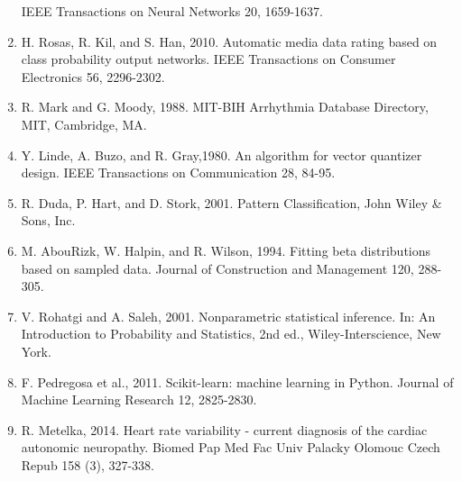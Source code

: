 \documentclass[times,twocolumn,final,authoryear]{elsarticle}
\begin{document}
\begin{enumerate}
     IEEE Transactions on Neural Networks 20, 1659-1637.
\item H. Rosas, R. Kil, and S. Han, 2010. Automatic media data rating based on class probability output networks.
     IEEE Transactions on Consumer Electronics 56, 2296-2302.
\item R. Mark and G. Moody, 1988. MIT-BIH Arrhythmia Database Directory, MIT, Cambridge, MA.
\item Y. Linde, A. Buzo, and R. Gray,1980. An algorithm for vector quantizer design.
     IEEE Transactions on Communication 28, 84-95.
\item R. Duda, P. Hart, and D. Stork, 2001. Pattern Classification, John Wiley \& Sons, Inc.
\item M. AbouRizk, W. Halpin, and R. Wilson, 1994. Fitting beta distributions based on sampled data.
     Journal of Construction and Management 120, 288-305.
\item V. Rohatgi and A. Saleh, 2001. Nonparametric statistical inference. In:
     An Introduction to Probability and Statistics, 2nd ed., Wiley-Interscience, New York.
\item F. Pedregosa et al., 2011. Scikit-learn: machine learning in Python.
     Journal of Machine Learning Research 12, 2825-2830.
\item R. Metelka, 2014. Heart rate variability - current diagnosis of the cardiac autonomic neuropathy. Biomed Pap Med Fac Univ Palacky Olomouc Czech Repub 158 (3), 327-338.
\end{enumerate}



\end{document}
